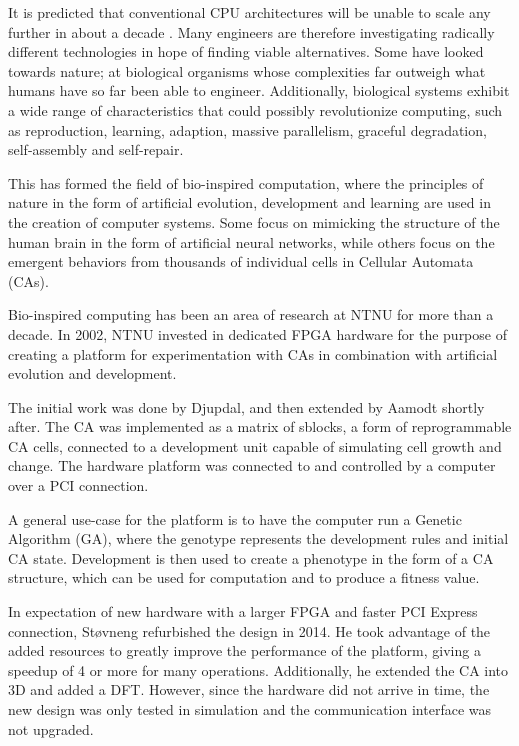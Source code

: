 
It is predicted that conventional CPU architectures will be unable to scale any further in about a decade \cite{esmaeilzadeh2011end}.
Many engineers are therefore investigating radically different technologies in hope of finding viable alternatives.
Some have looked towards nature; at biological organisms whose complexities far outweigh what humans have so far been able to engineer.
Additionally, biological systems exhibit a wide range of characteristics that could possibly revolutionize computing, such as reproduction, learning, adaption, massive parallelism, graceful degradation, self-assembly and self-repair.


This has formed the field of bio-inspired computation, where the principles of nature in the form of artificial evolution, development and learning are used in the creation of computer systems.
Some focus on mimicking the structure of the human brain in the form of artificial neural networks, while others focus on the emergent behaviors from thousands of individual cells in Cellular Automata (CAs).


Bio-inspired computing has been an area of research at NTNU for more than a decade.
In 2002, NTNU invested in dedicated FPGA hardware for the purpose of creating a platform for experimentation with CAs in combination with artificial evolution and development.

The initial work was done by Djupdal, and then extended by Aamodt shortly after.
The CA was implemented as a matrix of sblocks, a form of reprogrammable CA cells, connected to a development unit capable of simulating cell growth and change.
The hardware platform was connected to and controlled by a computer over a PCI connection.

A general use-case for the platform is to have the computer run a Genetic Algorithm (GA), where the genotype represents the development rules and initial CA state.
Development is then used to create a phenotype in the form of a CA structure, which can be used for computation and to produce a fitness value.

In expectation of new hardware with a larger FPGA and faster PCI Express connection, Støvneng refurbished the design in 2014.
He took advantage of the added resources to greatly improve the performance of the platform, giving a speedup of 4 or more for many operations.
Additionally, he extended the CA into 3D and added a DFT.
However, since the hardware did not arrive in time, the new design was only tested in simulation and the communication interface was not upgraded.

